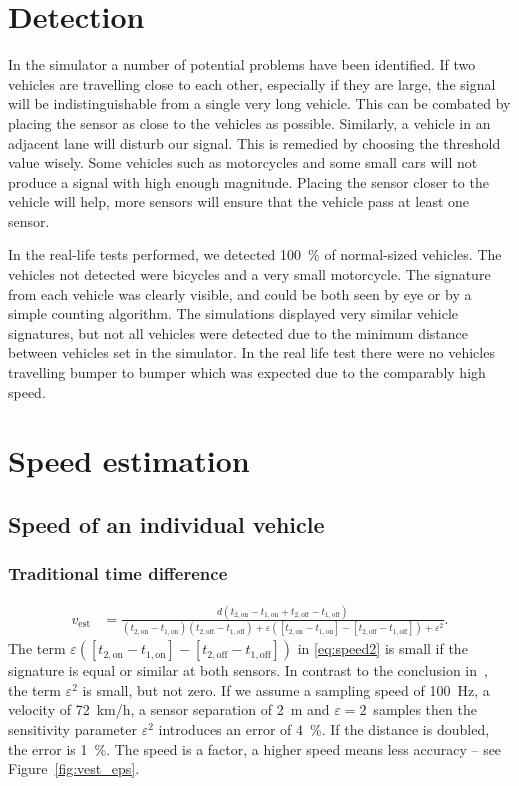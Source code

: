 \section{Detection}
In the simulator a number of potential problems have been identified. If two vehicles are travelling close to each other, especially if they are large, the signal will be indistinguishable from a single very long vehicle. This can be combated by placing the sensor as close to the vehicles as possible.  Similarly, a vehicle in an adjacent lane will disturb our signal. This is remedied by choosing the threshold value wisely. Some vehicles such as motorcycles and some small cars will not produce a signal with high enough magnitude. Placing the sensor closer to the vehicle will help, more sensors will ensure that the vehicle pass at least one sensor.

In the real-life tests performed, we detected 100~\% of normal-sized vehicles. The vehicles not detected were bicycles and a very small motorcycle. The signature from each vehicle was clearly visible, and could be both seen by eye or by a simple counting algorithm. The simulations displayed very similar vehicle signatures, but not all vehicles were detected due to the minimum distance between vehicles set in the simulator. In the real life test there were no vehicles travelling bumper to bumper which was expected due to the comparably high speed.

\section{Speed estimation}

\subsection{Speed of an individual vehicle}
\subsubsection{Traditional time difference}
\begin{align}
 v_{\text{est}} &= \frac{d\left(t_{2,\text{on}}-t_{1,\text{on}}+ t_{2,\text{off}} - t_{1,\text{off}}\right)}{(t_{2,\text{on}}-t_{1,\text{on}})(t_{2,\text{off}} - t_{1,\text{off}})+ \varepsilon\left([t_{2,\text{on}}-t_{1,\text{on}}]- [t_{2,\text{off}} - t_{1,\text{off}}]\right) + \varepsilon^2}.
  \label{eq:speed2}
\end{align}
The term $\varepsilon\left([t_{2,\text{on}}-t_{1,\text{on}}]- [t_{2,\text{off}} - t_{1,\text{off}}]\right)$ in \eqref{eq:speed2} is small if the signature is equal or similar at both sensors. In contrast to the conclusion in~\cite{path2007}, the term $\varepsilon^2$ is small, but not zero. If we assume a sampling speed of 100~Hz, a velocity of 72~km/h, a sensor separation of 2~m and $\varepsilon = 2$~samples then the sensitivity parameter $\varepsilon^2$ introduces an error of 4~\%. If the distance is doubled, the error is 1~\%. The speed is a factor, a higher speed means less accuracy -- see Figure~\ref{fig:vest_eps}.


